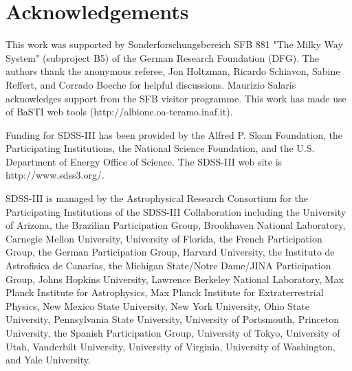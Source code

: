 \documentclass[a4paper,fleqn,usenatbib]{mnras}
\begin{document}
\section*{Acknowledgements}

This work was supported by Sonderforschungsbereich SFB 881 "The Milky Way System" (subproject B5) of the German Research Foundation (DFG). The authors thank the anonymous referee, Jon Holtzman, Ricardo Schiavon, Sabine Reffert, and Corrado Boeche for helpful discussions. Maurizio Salaris acknowledges support from the SFB visitor programme. This work has made use of BaSTI web tools (http://albione.oa-teramo.inaf.it).

Funding for SDSS-III has been provided by the Alfred P. Sloan Foundation, the Participating Institutions, the National Science Foundation, and the U.S. Department of Energy Office of Science. The SDSS-III web site is http://www.sdss3.org/.

SDSS-III is managed by the Astrophysical Research Consortium for the Participating Institutions of the SDSS-III Collaboration including the University of Arizona, the Brazilian Participation Group, Brookhaven National Laboratory, Carnegie Mellon University, University of Florida, the French Participation Group, the German Participation Group, Harvard University, the Instituto de Astrofisica de Canarias, the Michigan State/Notre Dame/JINA Participation Group, Johns Hopkins University, Lawrence Berkeley National Laboratory, Max Planck Institute for Astrophysics, Max Planck Institute for Extraterrestrial Physics, New Mexico State University, New York University, Ohio State University, Pennsylvania State University, University of Portsmouth, Princeton University, the Spanish Participation Group, University of Tokyo, University of Utah, Vanderbilt University, University of Virginia, University of Washington, and Yale University.







%


\end{document}
